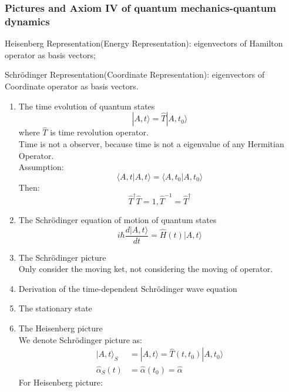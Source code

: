 \documentclass[12pt]{article}
\numberwithin{equation}{section}
\begin{document}
\subsubsection{Pictures and Axiom IV of quantum mechanics-quantum dynamics}
	Heisenberg Representation(Energy Representation): eigenvectors of Hamilton operator as basis vectors;\par
	Schr\"{o}dinger Representation(Coordinate Representation): eigenvectors of Coordinate operator as basis vectors.
\begin{enumerate}
\item The time evolution of quantum states
	\begin{equation}|A,t\rangle=\hat{T}|A,t_0\rangle\end{equation}
	where $\hat{T}$ is time revolution operator. \\
	Time is not a observer, because time is not a eigenvalue of any Hermitian Operator.\\
	Assumption: 
	\begin{equation}\langle A, t|A, t\rangle=\langle A, t_0|A, t_0\rangle\end{equation}
	Then:
	\begin{equation}\hat{T}^\dag\hat{T}=1, \hat{T}^{-1}=\hat{T}^\dag\end{equation}
\item The Schr\"{o}dinger equation of motion of quantum states
	\begin{equation}i\hbar\frac{d|A, t\rangle}{dt}=\hat{H}(t)|A, t\rangle\end{equation}
\item The Schr\"{o}dinger picture\\
	Only consider the moving ket, not considering the moving of operator.
\item Derivation of the time-dependent Schr\"{o}dinger wave equation
\item The stationary state 
\item The Heisenberg picture\\
	We denote Schr\"{o}dinger picture as:
	\begin{equation}\begin{split}
	|A,t\rangle_S&=|A,t\rangle=\hat{T}(t, t_0)|A,t_0\rangle \\
	\hat{\alpha}_S(t)&=\hat{\alpha}(t_0)=\hat{\alpha}
	\end{split}\end{equation}
	For Heisenberg picture:
	\begin{equation}\begin{split}

\end{split}
\end{equation}
\end{enumerate}
\end{document}

